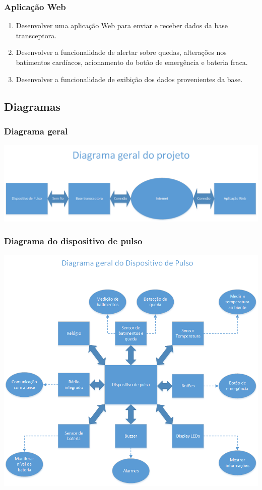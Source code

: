 \documentclass[a4paper]{article}
\begin{document}
\subsubsection{Aplicação Web}
\begin{enumerate}
\item Desenvolver uma aplicação Web para enviar e receber dados da base transceptora.
\item Desenvolver a funcionalidade de alertar sobre quedas, alterações nos batimentos cardíacos, acionamento do botão de emergência e bateria fraca.
\item Desenvolver a funcionalidade de exibição dos dados provenientes da base.
\end{enumerate}

\subsection{Diagramas}

\subsubsection{Diagrama geral}
\begin{center}
\includegraphics[scale=0.75]{figuras/diagrama_geral}
\end{center}

\subsubsection{Diagrama do dispositivo de pulso}
\begin{center}
\includegraphics[scale=0.75]{figuras/diagrama_pulso}
\end{center}
\end{document}
